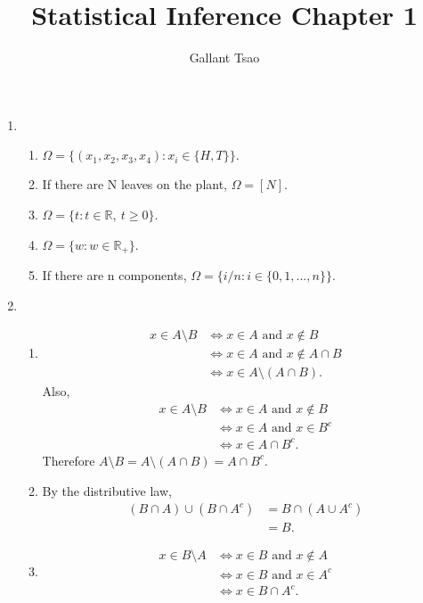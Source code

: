 \documentclass{article}
\title{Statistical Inference Chapter 1}
\author{Gallant Tsao}
\begin{document}
\maketitle

\begin{enumerate}
    \item \begin{enumerate}
        \item $\Omega = \{(x_1, x_2, x_3, x_4): x_i \in \{H, T\}\}.$
        \item If there are N leaves on the plant, $\Omega = [N]$.
        \item $\Omega = \{t: t \in \mathbb{R},\ t \geq 0\}$.
        \item $\Omega = \{w: w \in \mathbb{R}_{+}\}$.
        \item If there are n components, $\Omega = \{i/n: i \in \{0, 1, ..., n\}\}$.
    \end{enumerate}

    \item \begin{enumerate}
        \item \begin{align*}
            x \in A \setminus B 
            &\iff x \in A \text{ and } x \notin B \\
            &\iff x \in A \text{ and } x \notin A \cap B \\
            &\iff x \in A \setminus (A \cap B).
        \end{align*}
        Also, 
        \begin{align*}
            x \in A \setminus B
            &\iff x \in A \text{ and } x \notin B \\
            &\iff x \in A \text{ and } x \in B^{c} \\
            &\iff x \in A \cap B^{c}.
        \end{align*}
        Therefore $A \setminus B = A \setminus (A \cap B) = A \cap B^{c}$.

        \item By the distributive law, \begin{align*}
            (B \cap A) \cup (B \cap A^{c}) 
            &= B \cap (A \cup A^c) \\
            &= B.
        \end{align*}

        \item \begin{align*}
            x \in B \setminus A
            &\iff x \in B \text{ and } x \notin A \\
            &\iff x \in B \text{ and } x \in A^c \\
            &\iff x \in B \cap A^c.
        \end{align*}


\end{enumerate}
\end{enumerate}
\end{document}
